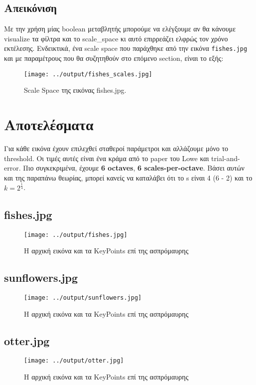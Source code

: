 \documentclass[11pt]{scrartcl} %
\begin{document}
\subsection{Απεικόνιση}

Με την χρήση μίας boolean μεταβλητής μπορούμε να ελέγξουμε αν θα κάνουμε visualize τα φίλτρα και το scale\_space κι αυτό επιρρεάζει
ελφρώς τον χρόνο εκτέλεσης. Ενδεικτικά, ένα scale space που παράχθηκε από την εικόνα \texttt{fishes.jpg} και με παραμέτρους που θα
συζητηθούν στο επόμενο section, είναι το εξής:

\begin{figure}[H]
  \centerline{\texttt{[image: ../output/fishes\_scales.jpg]}}
  \caption{Scale Space της εικόνας fishes.jpg.}
\end{figure}

\section{Αποτελέσματα}

Για κάθε εικόνα έχουν επιλεχθεί σταθεροί παράμετροι και αλλάζουμε μόνο το threshold. Οι τιμές αυτές
είναι ένα κράμα από το paper του Lowe και trial-and-error. Πιο συγκεκριμένα, έχουμε \textbf{6 octaves},
\textbf{6 scales-per-octave}. Βάσει αυτών και της παραπάνω θεωρίας, μπορεί κανείς να καταλάβει ότι το s
είναι 4 (6 - 2) και το $k=2^{\frac{1}{4}}$.
\subsection{fishes.jpg}
\begin{figure}[H]
  \centerline{\texttt{[image: ../output/fishes.jpg]}}
  \caption{H αρχική εικόνα και τα KeyPoints επί της ασπρόμαυρης}
\end{figure}


\subsection{sunflowers.jpg}
\begin{figure}[H]
  \centerline{\texttt{[image: ../output/sunflowers.jpg]}}
  \caption{H αρχική εικόνα και τα KeyPoints επί της ασπρόμαυρης}
\end{figure}

\subsection{otter.jpg}
\begin{figure}[H]
  \centerline{\texttt{[image: ../output/otter.jpg]}}
  \caption{H αρχική εικόνα και τα KeyPoints επί της ασπρόμαυρης}
\end{figure}
\end{document}
